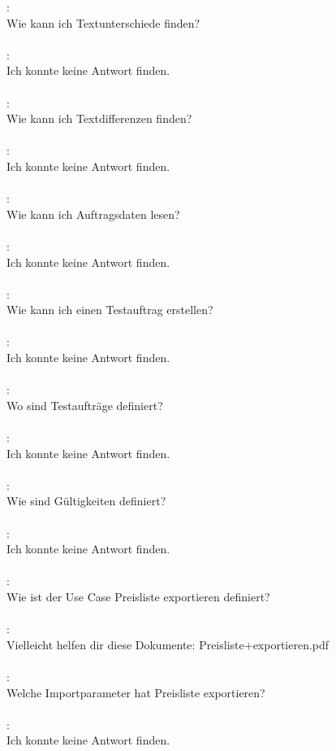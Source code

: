\speaker{\RobinGebauer}: \\
Wie kann ich Textunterschiede finden? \\\\
\speaker{\Chatbot}: \\
Ich konnte keine Antwort finden. \\\\
\speaker{\RobinGebauer}: \\
Wie kann ich Textdifferenzen finden? \\\\
\speaker{\Chatbot}: \\
Ich konnte keine Antwort finden. \\\\
\speaker{\RobinGebauer}: \\
Wie kann ich Auftragsdaten lesen? \\\\
\speaker{\Chatbot}: \\
Ich konnte keine Antwort finden. \\\\
\speaker{\RobinGebauer}: \\
Wie kann ich einen Testauftrag erstellen? \\\\
\speaker{\Chatbot}: \\
Ich konnte keine Antwort finden. \\\\
\speaker{\RobinGebauer}: \\
Wo sind Testaufträge definiert? \\\\
\speaker{\Chatbot}: \\
Ich konnte keine Antwort finden. \\\\
\speaker{\RobinGebauer}: \\
Wie sind Gültigkeiten definiert? \\\\
\speaker{\Chatbot}: \\
Ich konnte keine Antwort finden. \\\\
\speaker{\RobinGebauer}: \\
Wie ist der Use Case Preisliste exportieren definiert? \\\\
\speaker{\Chatbot}: \\
Vielleicht helfen dir diese Dokumente: Preisliste+exportieren.pdf \\\\
\speaker{\RobinGebauer}: \\
Welche Importparameter hat Preisliste exportieren? \\\\
\speaker{\Chatbot}: \\
Ich konnte keine Antwort finden.
